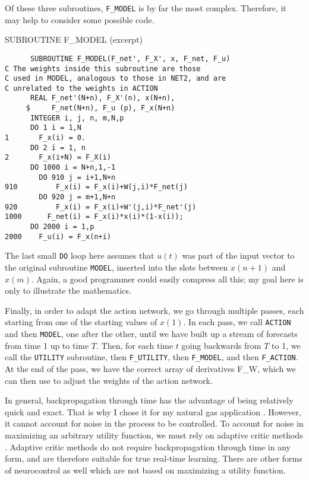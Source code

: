 \documentclass[journal]{IEEEtran} %
\begin{document}
Of these three subroutines, \texttt{F\_MODEL} is by far the most complex. Therefore, it may help to consider some possible code.
\begin{fortrancode}
\caption{SUBROUTINE F\_MODEL (excerpt)}
\begin{verbatim}
      SUBROUTINE F_MODEL(F_net', F_X', x, F_net, F_u)
C The weights inside this subroutine are those
C used in MODEL, analogous to those in NET2, and are
C unrelated to the weights in ACTION
      REAL F_net'(N+n), F_X'(n), x(N+n),
     $     F_net(N+n), F_u (p), F_x(N+n)
      INTEGER i, j, n, m,N,p
      DO 1 i = 1,N
1       F_x(i) = 0.
      DO 2 i = 1, n
2       F_x(i+N) = F_X(i)
      DO 1000 i = N+n,1,-1
        DO 910 j = i+1,N+n
910         F_x(i) = F_x(i)+W(j,i)*F_net(j)
        DO 920 j = m+1,N+n
920         F_x(i) = F_x(i)+W'(j,i)*F_net'(j)
1000      F_net(i) = F_x(i)*x(i)*(1-x(i));
      DO 2000 i = 1,p
2000    F_u(i) = F_x(n+i)
\end{verbatim}
\end{fortrancode}

The last small \texttt{DO} loop here assumes that $u(t)$ was part of the input vector to the original subroutine \texttt{MODEL}, inserted into the slots between $x(n+1)$ and $x(m)$. Again, a good programmer could easily compress all this; my goal here is only to illustrate the mathematics.

Finally, in order to adapt the action network, we go through multiple passes, each starting from one of the starting values of $x(1)$. In each pass, we call \texttt{ACTION} and then \texttt{MODEL}, one after the other, until we have built up a stream of forecasts from time 1 up to time $T$. Then, for each time $t$ going backwards from $T$ to 1, we call the \texttt{UTILITY} subroutine, then \texttt{F\_UTILITY}, then \texttt{F\_MODEL}, and then \texttt{F\_ACTION}. At the end of the pass, we have the correct array of derivatives F\_W, which we can then use to adjust the weights of the action network.

In general, backpropagation through time has the advantage of being relatively quick and exact. That is why I chose it for my natural gas application \cite{Werbos:1987b}. However, it cannot account for noise in the process to be controlled. To account for noise in maximizing an arbitrary utility function, we must rely on adaptive critic methods \cite{Werbos:1990}. Adaptive critic methods do not require backpropagation through time in any form, and are therefore suitable for true real-time learning. There are other forms of neurocontrol as well \cite{Werbos:1990} which are not based on maximizing a utility function.
\end{document}
